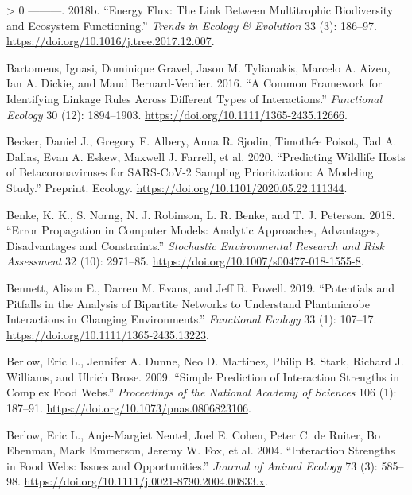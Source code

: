 \documentclass[10pt,oneside]{article}
\newlength{\cslhangindent}
\newenvironment{CSLReferences}[3] %
 {%
  \setlength{\parindent}{0pt}
  \ifodd #1 \everypar{\setlength{\hangindent}{\cslhangindent}}\ignorespaces\fi
  \ifnum #2 > 0
  \setlength{\parskip}{#2\baselineskip}
  \fi
 }%
 {}
\begin{document}
\begin{CSLReferences}{1}{0}
\leavevmode\hypertarget{ref-Barnes2018EneFlua}{}%
---------. 2018b. {``Energy Flux: The Link Between Multitrophic
Biodiversity and Ecosystem Functioning.''} \emph{Trends in Ecology \&
Evolution} 33 (3): 186--97.
\url{https://doi.org/10.1016/j.tree.2017.12.007}.

\leavevmode\hypertarget{ref-Bartomeus2016ComFra}{}%
Bartomeus, Ignasi, Dominique Gravel, Jason M. Tylianakis, Marcelo A.
Aizen, Ian A. Dickie, and Maud Bernard-Verdier. 2016. {``A Common
Framework for Identifying Linkage Rules Across Different Types of
Interactions.''} \emph{Functional Ecology} 30 (12): 1894--1903.
\url{https://doi.org/10.1111/1365-2435.12666}.

\leavevmode\hypertarget{ref-Becker2020PreWil}{}%
Becker, Daniel J., Gregory F. Albery, Anna R. Sjodin, Timothée Poisot,
Tad A. Dallas, Evan A. Eskew, Maxwell J. Farrell, et al. 2020.
{``Predicting Wildlife Hosts of Betacoronaviruses for SARS-CoV-2
Sampling Prioritization: A Modeling Study.''} Preprint. Ecology.
\url{https://doi.org/10.1101/2020.05.22.111344}.

\leavevmode\hypertarget{ref-Benke2018ErrPro}{}%
Benke, K. K., S. Norng, N. J. Robinson, L. R. Benke, and T. J. Peterson.
2018. {``Error Propagation in Computer Models: Analytic Approaches,
Advantages, Disadvantages and Constraints.''} \emph{Stochastic
Environmental Research and Risk Assessment} 32 (10): 2971--85.
\url{https://doi.org/10.1007/s00477-018-1555-8}.

\leavevmode\hypertarget{ref-Bennett2019PotPit}{}%
Bennett, Alison E., Darren M. Evans, and Jeff R. Powell. 2019.
{``Potentials and Pitfalls in the Analysis of Bipartite Networks to
Understand Plantmicrobe Interactions in Changing Environments.''}
\emph{Functional Ecology} 33 (1): 107--17.
\url{https://doi.org/10.1111/1365-2435.13223}.

\leavevmode\hypertarget{ref-Berlow2009SimPre}{}%
Berlow, Eric L., Jennifer A. Dunne, Neo D. Martinez, Philip B. Stark,
Richard J. Williams, and Ulrich Brose. 2009. {``Simple Prediction of
Interaction Strengths in Complex Food Webs.''} \emph{Proceedings of the
National Academy of Sciences} 106 (1): 187--91.
\url{https://doi.org/10.1073/pnas.0806823106}.

\leavevmode\hypertarget{ref-Berlow2004IntStr}{}%
Berlow, Eric L., Anje-Margiet Neutel, Joel E. Cohen, Peter C. de Ruiter,
Bo Ebenman, Mark Emmerson, Jeremy W. Fox, et al. 2004. {``Interaction
Strengths in Food Webs: Issues and Opportunities.''} \emph{Journal of
Animal Ecology} 73 (3): 585--98.
\url{https://doi.org/10.1111/j.0021-8790.2004.00833.x}.


\end{CSLReferences}
\end{document}
